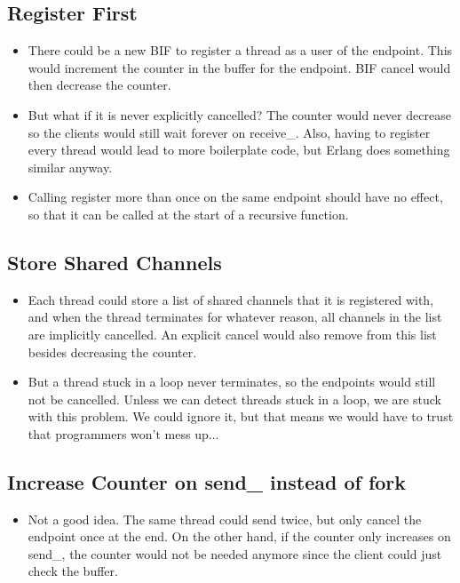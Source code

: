 \documentclass[a4paper,11pt]{article}
\theoremstyle{plain}
\theoremstyle{nonumberplain}
\begin{document}
\subsection{Register First}

\begin{itemize}
  \item There could be a new BIF to register a thread as a user of the endpoint. This would increment the counter in the buffer for the endpoint. BIF cancel would then decrease the counter.
  \item But what if it is never explicitly cancelled? The counter would never decrease so the clients would still wait forever on receive\_. Also, having to register every thread would lead to more boilerplate code, but Erlang does something similar anyway.
  \item Calling register more than once on the same endpoint should have no effect, so that it can be called at the start of a recursive function.
\end{itemize}

\subsection{Store Shared Channels}

\begin{itemize}
  \item Each thread could store a list of shared channels that it is registered with, and when the thread terminates for whatever reason, all channels in the list are implicitly cancelled. An explicit cancel would also remove from this list besides decreasing the counter.
  \item But a thread stuck in a loop never terminates, so the endpoints would still not be cancelled. Unless we can detect threads stuck in a loop, we are stuck with this problem. We could ignore it, but that means we would have to trust that programmers won't mess up...
\end{itemize}

\subsection{Increase Counter on send\_ instead of fork}

\begin{itemize}
  \item Not a good idea. The same thread could send twice, but only cancel the endpoint once at the end. On the other hand, if the counter only increases on send\_, the counter would not be needed anymore since the client could just check the buffer.
\end{itemize}
\end{document}

